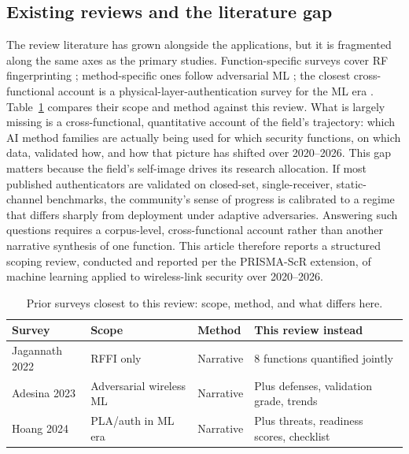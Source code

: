 \documentclass[10.5pt,compsoc,winfonts]{ICN}
\newcommand{\upcite}[1]{\cite{#1}}
\begin{document}
\subsection{Existing reviews and the literature gap}
The review literature has grown alongside the applications, but it is fragmented along the same axes as the primary studies. Function-specific surveys cover RF fingerprinting \upcite{B03}; method-specific ones follow adversarial ML \upcite{B07}; the closest cross-functional account is a physical-layer-authentication survey for the ML era \upcite{B02}. Table~\ref{tab:priors} compares their scope and method against this review. What is largely missing is a cross-functional, quantitative account of the field's trajectory: which AI method families are actually being used for which security functions, on which data, validated how, and how that picture has shifted over 2020–2026. This gap matters because the field's self-image drives its research allocation. If most published authenticators are validated on closed-set, single-receiver, static-channel benchmarks, the community's sense of progress is calibrated to a regime that differs sharply from deployment under adaptive adversaries. Answering such questions requires a corpus-level, cross-functional account rather than another narrative synthesis of one function. This article therefore reports a structured scoping review, conducted and reported per the PRISMA-ScR extension, of machine learning applied to wireless-link security over 2020–2026.

\begin{table}[tbp]
\centering
\footnotesize
\caption{Prior surveys closest to this review: scope, method, and what differs here.}
\label{tab:priors}
\begin{tabular}{@{}l p{3.6cm} p{2.6cm} p{5.2cm}@{}}
\toprule
Survey & Scope & Method & This review instead \\
\midrule
{\upcite{B03}} Jagannath 2022 & RFFI only & Narrative & 8 functions quantified jointly \\
{\upcite{B07}} Adesina 2023 & Adversarial wireless ML & Narrative & Plus defenses, validation grade, trends \\
{\upcite{B02}} Hoang 2024 & PLA/auth in ML era & Narrative & Plus threats, readiness scores, checklist \\
\bottomrule
\end{tabular}
\end{table}
\end{document}
